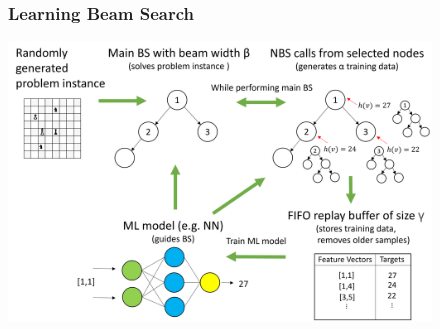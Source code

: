 \documentclass[aspectratio=1610]{beamer}
\newcommand{\important}[1]{{\color{green!60!black}#1}}
\begin{document}
									


	
\begin{frame}
\frametitle{Learning Beam Search \citep{huber-21}}
	\begin{center}
		\includegraphics[height=210pt]{figures/lbsProcedure.png}
	\end{center}
\end{frame}
	
\end{document}
